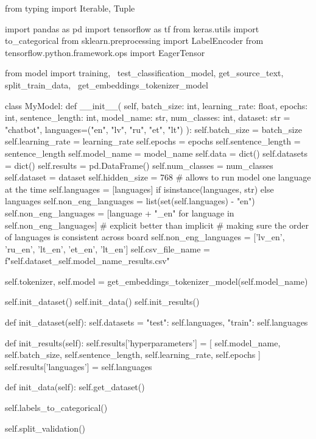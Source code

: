 \begin{python}
from typing import Iterable, Tuple

import pandas as pd
import tensorflow as tf
from keras.utils import to_categorical
from sklearn.preprocessing import LabelEncoder
from tensorflow.python.framework.ops import EagerTensor

from model import training, \
  test_classification_model, get_source_text, split_train_data, \
  get_embeddings_tokenizer_model


class MyModel:
  def __init__(
      self, batch_size: int, learning_rate: float, epochs: int,
      sentence_length: int, model_name: str,
      num_classes: int, dataset: str = "chatbot",
      languages=("en", "lv", "ru", "et", "lt")
  ):
    self.batch_size = batch_size
    self.learning_rate = learning_rate
    self.epochs = epochs
    self.sentence_length = sentence_length
    self.model_name = model_name
    self.data = dict()
    self.datasets = dict()
    self.results = pd.DataFrame()
    self.num_classes = num_classes
    self.dataset = dataset
    self.hidden_size = 768
    # allows to run model one language at the time
    self.languages = [languages] if isinstance(languages, str) else languages
    self.non_eng_languages = list(set(self.languages) - {"en"})
    self.non_eng_languages = [language + "_en" for language in
                              self.non_eng_languages]
    # explicit better than implicit
    # making sure the order of languages is consistent across board
    self.non_eng_languages = ['lv_en', 'ru_en', 'lt_en', 'et_en', 'lt_en']
    self.csv_file_name = f"{self.dataset}_{self.model_name}_results.csv"

    self.tokenizer, self.model = get_embeddings_tokenizer_model(self.model_name)

    self.init_dataset()
    self.init_data()
    self.init_results()

  def init_dataset(self):
    self.datasets = {
      "test": self.languages,
      "train": self.languages
    }

  def init_results(self):
    self.results['hyperparameters'] = [
      self.model_name, self.batch_size,
      self.sentence_length, self.learning_rate,
      self.epochs
    ]
    self.results['languages'] = self.languages

  def init_data(self):
    self.get_dataset()

    self.labels_to_categorical()

    self.split_validation()


\end{python}
